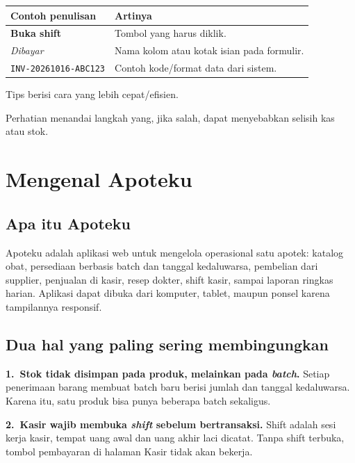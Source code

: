 \documentclass[11pt,a4paper]{article}
\newcommand{\app}{Apoteku}
\newcommand{\btn}[1]{\textcolor{primary}{\textbf{#1}}}
\newcommand{\field}[1]{\textit{#1}}
\newcommand{\code}[1]{\texttt{\small #1}}
\begin{document}
\begin{tabularx}{\textwidth}{@{}L{3.5cm}Y@{}}
  \toprule
  \textbf{Contoh penulisan} & \textbf{Artinya} \\
  \midrule
  \btn{Buka shift}   & Tombol yang harus diklik. \\
  \field{Dibayar}    & Nama kolom atau kotak isian pada formulir. \\
  \code{INV-20261016-ABC123} & Contoh kode/format data dari sistem. \\
  \midrule
  \end{tabularx}

\vspace{0.3cm}

\begin{tipbox}{}
Tips berisi cara yang lebih cepat/efisien.
\end{tipbox}

\begin{warnbox}{}
Perhatian menandai langkah yang, jika salah, dapat menyebabkan selisih kas atau
stok.
\end{warnbox}

\section{Mengenal Apoteku}

\subsection{Apa itu Apoteku}
\app{} adalah aplikasi web untuk mengelola operasional satu apotek: katalog obat,
persediaan berbasis batch dan tanggal kedaluwarsa, pembelian dari supplier,
penjualan di kasir, resep dokter, shift kasir, sampai laporan ringkas harian.
Aplikasi dapat dibuka dari komputer, tablet, maupun ponsel karena tampilannya
responsif.

\subsection{Dua hal yang paling sering membingungkan}

\textbf{1.\ Stok tidak disimpan pada produk, melainkan pada \emph{batch}.}
Setiap penerimaan barang membuat batch baru berisi jumlah dan tanggal
kedaluwarsa. Karena itu, satu produk bisa punya beberapa batch sekaligus.

\textbf{2.\ Kasir wajib membuka \emph{shift} sebelum bertransaksi.}
Shift adalah sesi kerja kasir, tempat uang awal dan uang akhir laci dicatat.
Tanpa shift terbuka, tombol pembayaran di halaman Kasir tidak akan bekerja.
\end{document}
